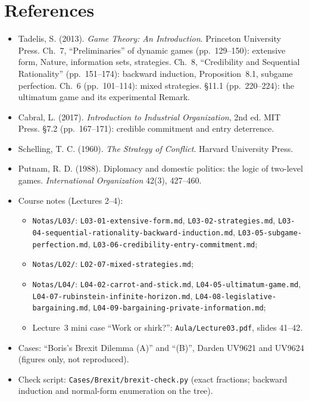 \documentclass[11pt,a4paper]{article}
\begin{document}
\section*{References}
\begin{itemize}[leftmargin=1.4em]\small\raggedright
  \item Tadelis, S. (2013). \emph{Game Theory: An Introduction}. Princeton University Press.
    Ch.~7, ``Preliminaries'' of dynamic games (pp.~129--150): extensive form, Nature, information
    sets, strategies. Ch.~8, ``Credibility and Sequential Rationality'' (pp.~151--174): backward
    induction, Proposition~8.1, subgame perfection. Ch.~6 (pp.~101--114): mixed strategies. \S11.1
    (pp.~220--224): the ultimatum game and its experimental Remark.
  \item Cabral, L. (2017). \emph{Introduction to Industrial Organization}, 2nd ed. MIT Press.
    \S7.2 (pp.~167--171): credible commitment and entry deterrence.
  \item Schelling, T. C. (1960). \emph{The Strategy of Conflict}. Harvard University Press.
  \item Putnam, R. D. (1988). Diplomacy and domestic politics: the logic of two-level games.
    \emph{International Organization} 42(3), 427--460.
  \item Course notes (Lectures 2--4):
    \begin{itemize}[leftmargin=1.2em,itemsep=0pt,topsep=1pt]
      \item \texttt{Notas/L03/}: \texttt{L03-01-extensive-form.md}, \texttt{L03-02-strategies.md},
        \texttt{L03-04-sequential-rationality-backward-induction.md},
        \texttt{L03-05-subgame-perfection.md}, \texttt{L03-06-credibility-entry-commitment.md};
      \item \texttt{Notas/L02/}: \texttt{L02-07-mixed-strategies.md};
      \item \texttt{Notas/L04/}: \texttt{L04-02-carrot-and-stick.md},
        \texttt{L04-05-ultimatum-game.md}, \texttt{L04-07-rubinstein-infinite-horizon.md},
        \texttt{L04-08-legislative-bargaining.md}, \texttt{L04-09-bargaining-private-information.md};
      \item Lecture~3 mini case ``Work or shirk?'': \texttt{Aula/Lecture03.pdf}, slides 41--42.
    \end{itemize}
  \item Cases: ``Boris's Brexit Dilemma (A)'' and ``(B)'', Darden UV9621 and UV9624 (figures only,
    not reproduced).
  \item Check script: \texttt{Cases/Brexit/brexit-check.py} (exact fractions; backward induction
    and normal-form enumeration on the tree).
\end{itemize}
\end{document}
